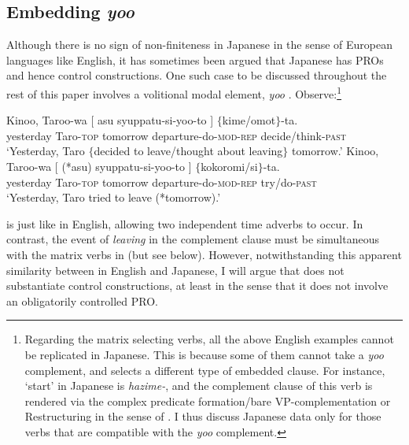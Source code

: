 \documentclass[output=paper]{langsci/langscibook}
\begin{document}
\subsection{Embedding \textit{yoo}}
Although there is no sign of non-finiteness in Japanese in the sense of European languages like English, it has sometimes been argued that Japanese has PROs and hence control constructions. One such case to be discussed throughout the rest of this paper involves a volitional modal element, \textit{yoo} \citep{fujii2006,fujii2010,uchibori2000,shimamura2015}. Observe:\footnote{Regarding the matrix selecting verbs, all the above English examples cannot be replicated in Japanese. This is because some of them cannot take a \textit{yoo} complement, and selects a different type of embedded clause. For instance, `start' in Japanese is \textit{hazime-}, and the complement clause of this verb is rendered via the complex predicate formation/bare VP-complementation or Restructuring in the sense of \citet{wurmbrand2001}. I thus discuss Japanese data only for those verbs that are compatible with the \textit{yoo} complement.}
\ea\label{shimamu5}
\begin{xlist}
\ex\label{shimamu5a} \gll Kinoo, Taroo-wa [ asu syuppatu-si-yoo-to ] $\{$kime/omot$\}$-ta.\\
yesterday Taro-\textsc{top} {} tomorrow departure-do-\textsc{mod-rep} {} \phantom{$\{$}decide/think-\textsc{past}\\
\glt `Yesterday, Taro $\{$decided to leave/thought about leaving$\}$ tomorrow.'
\ex\label{shimamu5b} \gll Kinoo, Taroo-wa [ (*asu) syuppatu-si-yoo-to ] $\{$kokoromi/si$\}$-ta.\\
yesterday Taro-\textsc{top} {} \phantom{*(}tomorrow departure-do-\textsc{mod-rep} {} \phantom{$\{$}try/do-\textsc{past}\\
\glt `Yesterday, Taro tried to leave (*tomorrow).'
\end{xlist}
\z
{} is just like  in English, allowing two independent time adverbs to occur. In contrast, the event of \textit{leaving} in the complement clause must be simultaneous with the matrix verbs in  (but see  below). However, notwithstanding this apparent similarity between in English and Japanese, I will argue that  does not substantiate control constructions, at least in the sense that it does not involve an obligatorily controlled PRO.
\end{document}
